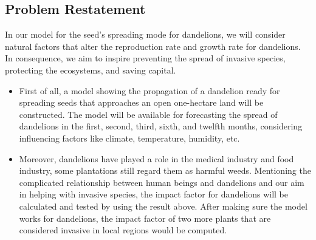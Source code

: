 \documentclass[12pt]{article}
\begin{document}
\subsection{Problem Restatement}
In our model for the seed’s spreading mode for dandelions, we will consider natural factors that alter the reproduction rate and growth rate for dandelions. In consequence, we aim to inspire preventing the spread of invasive species, protecting the ecosystems, and saving capital.
\begin{itemize}
    \item  %
    First of all, a model showing the propagation of a dandelion ready for spreading seeds that approaches an open one-hectare land will be constructed. The model will be available for forecasting the spread of dandelions in the first, second, third, sixth, and twelfth months, considering influencing factors like climate, temperature, humidity, etc. 
    \item %
    Moreover, dandelions have played a role in the medical industry and food industry, some plantations still regard them as harmful weeds. Mentioning the complicated relationship between human beings and dandelions and our aim in helping with invasive species, the impact factor for dandelions will be calculated and tested by using the result above. After making sure the model works for dandelions, the impact factor of two more plants that are considered invasive in local regions would be computed.
\end{itemize}%
\end{document}
